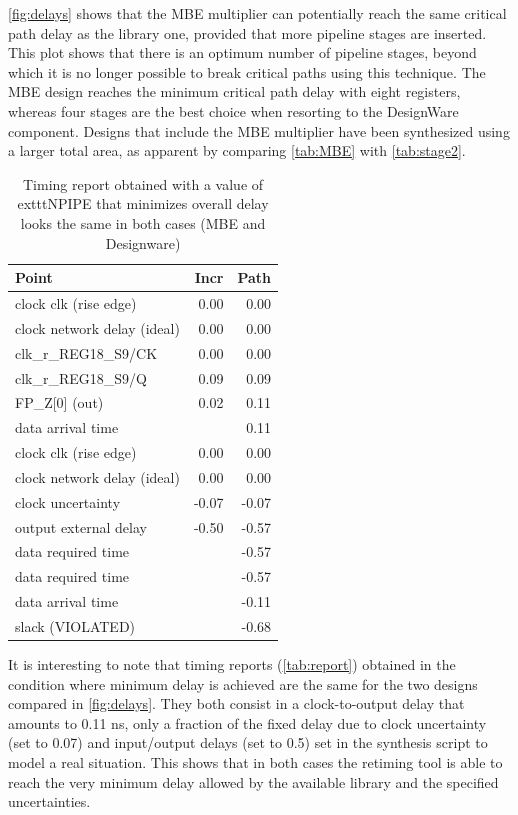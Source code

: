\autoref{fig:delays} shows that the MBE multiplier can potentially reach the same critical path delay as the library one, provided that more pipeline stages are inserted. This plot shows that there is an optimum number of pipeline stages, beyond which it is no longer possible to break critical paths using this technique. The MBE design reaches the minimum critical path delay with eight registers, whereas four stages are the best choice when resorting to the DesignWare component. Designs that include the MBE multiplier have been synthesized using a larger total area, as apparent by comparing \autoref{tab:MBE} with \autoref{tab:stage2}.

\begin{table}
    \centering
    \begin{tabular}{|lrr|}\hline
        Point                        & Incr  & Path  \\
        \hline
        clock clk (rise edge)        &  0.00 &  0.00 \\
        clock network delay (ideal)  &  0.00 &  0.00 \\
        clk\_r\_REG18\_S9/CK         &  0.00 &  0.00 \\
        clk\_r\_REG18\_S9/Q          &  0.09 &  0.09 \\
        FP\_Z[0] (out)               &  0.02 &  0.11 \\
        data arrival time            &       &  0.11 \\
        \hline
        clock clk (rise edge)        &  0.00 &  0.00 \\
        clock network delay (ideal)  &  0.00 &  0.00 \\
        clock uncertainty            & -0.07 & -0.07 \\
        output external delay        & -0.50 & -0.57 \\
        \hline
        data required time           &       & -0.57 \\
        data required time           &       & -0.57 \\
        data arrival time            &       & -0.11 \\
        \hline
        slack (VIOLATED)             &       & -0.68 \\
        \hline
    \end{tabular}
    \caption{Timing report obtained with a value of exttt{NPIPE} that minimizes overall delay looks the same in both cases (MBE and Designware)}
    \label{tab:report}
\end{table}

It is interesting to note that timing reports (\autoref{tab:report}) obtained in the condition where minimum delay is achieved are the same for the two designs compared in \autoref{fig:delays}. They both consist in a clock-to-output delay that amounts to 0.11 ns, only a fraction of the fixed delay due to clock uncertainty (set to 0.07) and input/output delays (set to 0.5) set in the synthesis script to model a real situation. This shows that in both cases the retiming tool is able to reach the very minimum delay allowed by the available library and the specified uncertainties.
